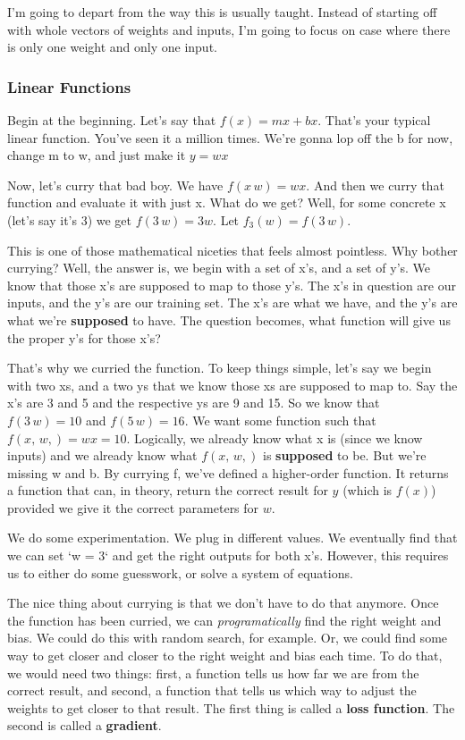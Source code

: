 \documentclass[11pt]{article}
\begin{document}
I'm going to depart from the way this is usually taught. Instead of starting off with whole vectors of weights and inputs, I'm going to focus on case where there is only one weight and only one input.
\subsubsection{Linear Functions}
\label{sec:orgfc8e730}
Begin at the beginning. Let's say that \(f(x) = mx + bx\). That's your typical linear function. You've seen it a million times. We're gonna lop off the b for now, change m to w, and just make it \(y = wx\)

Now, let's curry that bad boy. We have \(f(x\,w) = wx\). And then we curry that function and evaluate it with just x. What do we get? Well, for some concrete x (let's say it's 3) we get \(f(3\,w) = 3w\). Let \(f_3(w) = f(3\,w)\).

This is one of those mathematical niceties that feels almost pointless. Why bother currying? Well, the answer is, we begin with a set of x's, and a set of y's. We know that those x's are supposed to map to those y's. The x's in question are our inputs, and the y's are our training set. The x's are what we have, and the y's are what we're \textbf{supposed} to have. The question becomes, what function will give us the proper y's for those x's?

That's why we curried the function. To keep things simple, let's say we begin with two xs, and a two ys that we know those xs are supposed to map to. Say the x's are 3 and 5 and the respective ys are 9 and 15. So we know that \(f(3\,w) = 10\) and \(f(5\,w) = 16\). We want some function such that \(f(x,\,w,) = wx = 10\). Logically, we already know what x is (since we know inputs) and we already know what \(f(x,\,w,)\) is \textbf{supposed} to be. But we're missing w and b. By currying f, we've defined a higher-order function. It returns a function that can, in theory, return the correct result for \(y\) (which is \(f(x)\)) provided we give it the correct parameters for \(w\).

We do some experimentation. We plug in different values. We eventually find that we can set `w = 3` and get the right outputs for both x's. However, this requires us to either do some guesswork, or solve a system of equations.

The nice thing about currying is that we don't have to do that anymore. Once the function has been curried, we can \emph{programatically} find the right weight and bias. We could do this with random search, for example. Or, we could find some way to get closer and closer to the right weight and bias each time. To do that, we would need two things: first, a function tells us how far we are from the correct result, and second, a function that tells us which way to adjust the weights to get closer to that result. The first thing is called a \textbf{loss function}. The second is called a \textbf{gradient}.
\end{document}
